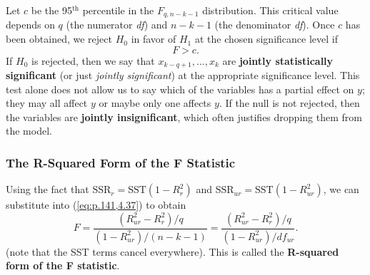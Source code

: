 \documentclass[a4paper, 10pt]{article}
\theoremstyle{definition}	%
\begin{document}
Let $c$ be the 95$^\text{th}$ percentile in the $F_{q, n-k-1}$ distribution. This critical value depends on $q$ (the numerator \textit{df}) and $n - k - 1$ (the denominator \textit{df}). Once $c$ has been obtained, we reject $H_0$ in favor of $H_1$ at the chosen significance level if
\begin{equation}
    F > c. \label{eq:p.142,4.40}
\end{equation}
If $H_0$ is rejected, then we say that $x_{k-q+1}, \dots, x_k$ are \textbf{jointly statistically significant} (or just \textit{jointly significant}) at the appropriate significance level. This test alone does not allow us to say which of the variables has a partial effect on $y$; they may all affect $y$ or maybe only one affects $y$. If the null is not rejected, then the variables are \textbf{jointly insignificant}, which often justifies dropping them from the model.
\subsubsection{The R-Squared Form of the F Statistic}
Using the fact that $\text{SSR}_r = \text{SST}(1 - R^2_r)$ and $\text{SSR}_{ur} = \text{SST}(1 - R^2_{ur})$, we can substitute into (\ref{eq:p.141,4.37}) to obtain
\begin{equation}
    F = \frac{(R^2_{ur} - R^2_r)/q}{(1 - R^2_{ur})/(n - k - 1)} = \frac{(R^2_{ur} - R^2_r)/q}{(1 - R^2_{ur})/df_{ur}}. \label{eq:p.145,4.41}
\end{equation}
(note that the SST terms cancel everywhere). This is called the \textbf{R-squared form of the F statistic}.
\end{document}
